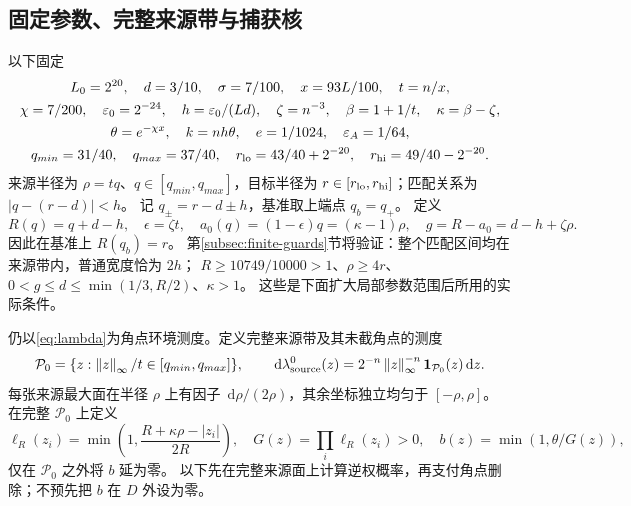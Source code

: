 \documentclass[UTF8,a4paper,11pt,fontset=fandol]{ctexart}
\theoremstyle{remark}
\newcommand{\one}{\mathbf 1}
\newcommand{\norm}[1]{\left\lVert#1\right\rVert}
\newcommand{\dint}{\,\mathrm d}
\begin{document}
\subsection{固定参数、完整来源带与捕获核}\label{subsec:refined-parameters}
以下固定
\begin{equation}\label{eq:refined-parameters}
\begin{gathered}
 L_0=2^{20},\quad d=3/10,\quad\sigma=7/100,\quad x=93L/100,\quad t=n/x,\\
 \chi=7/200,\quad\varepsilon_0=2^{-24},\quad h=\varepsilon_0/(Ld),
 \quad\zeta=n^{-3},\quad\beta=1+1/t,\quad\kappa=\beta-\zeta,\\
 \theta=e^{-\chi x},\quad k=nh\theta,\quad e=1/1024,\quad\varepsilon_A=1/64,\\
 q_{min}=31/40,\quad q_{max}=37/40,\quad
 r_{\rm lo}=43/40+2^{-20},\quad r_{\rm hi}=49/40-2^{-20}.
\end{gathered}
\end{equation}
来源半径为 $\rho=tq$、$q\in[q_{min},q_{max}]$，目标半径为
$r\in[r_{\rm lo},r_{\rm hi}]$；匹配关系为 $|q-(r-d)|<h$。
记 $q_\pm=r-d\pm h$，基准取上端点 $q_b=q_+$。
定义
\[
 R(q)=q+d-h,\quad\epsilon=\zeta t,\quad
 a_0(q)=(1-\epsilon)q=(\kappa-1)\rho,\quad g=R-a_0=d-h+\zeta\rho.
\]
因此在基准上 $R(q_b)=r$。
第\ref{subsec:finite-guards}节将验证：整个匹配区间均在来源带内，普通宽度恰为 $2h$；
$R\ge10749/10000>1$、$\rho\ge4r$、$0<g\le d\le\min(1/3,R/2)$、$\kappa>1$。
这些是下面扩大局部参数范围后所用的实际条件。

仍以\eqref{eq:lambda}为角点环境测度。定义完整来源带及其未截角点的测度
\[
 \mathcal P_0=\{z:\norm z_\infty/t\in[q_{min},q_{max}]\},\qquad
 \dint\lambda^0_{\rm source}(z)=2^{-n}\norm z_\infty^{-n}\one_{\mathcal P_0}(z)\dint z.
\]
每张来源最大面在半径 $\rho$ 上有因子 $\dint\rho/(2\rho)$，其余坐标独立均匀于 $[-\rho,\rho]$。
在完整 $\mathcal P_0$ 上定义
\[
 \ell_R(z_i)=\min\left(1,\frac{R+\kappa\rho-|z_i|}{2R}\right),\quad
 G(z)=\prod_i\ell_R(z_i)>0,\quad b(z)=\min(1,\theta/G(z)),
\]
仅在 $\mathcal P_0$ 之外将 $b$ 延为零。
以下先在完整来源面上计算逆权概率，再支付角点删除；不预先把 $b$ 在 $D$ 外设为零。
\end{document}

